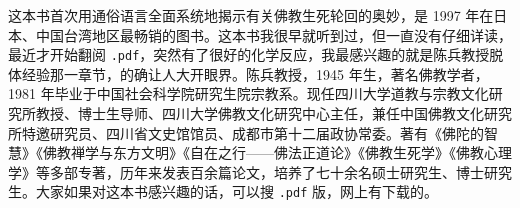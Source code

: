 \begin{book}
    这本书首次用通俗语言全面系统地揭示有关佛教生死轮回的奥妙，是 1997 年在日本、中国台湾地区最畅销的图书。这本书我很早就听到过，但一直没有仔细详读，最近才开始翻阅 \texttt{.pdf}，突然有了很好的化学反应，我最感兴趣的就是陈兵教授脱体经验那一章节，的确让人大开眼界。陈兵教授，1945 年生，著名佛教学者，1981 年毕业于中国社会科学院研究生院宗教系。现任四川大学道教与宗教文化研究所教授、博士生导师、四川大学佛教文化研究中心主任，兼任中国佛教文化研究所特邀研究员、四川省文史馆馆员、成都市第十二届政协常委。著有《佛陀的智慧》《佛教禅学与东方文明》《自在之行——佛法正道论》《佛教生死学》《佛教心理学》等多部专著，历年来发表百余篇论文，培养了七十余名硕士研究生、博士研究生。大家如果对这本书感兴趣的话，可以搜 \texttt{.pdf} 版，网上有下载的。
\end{book}
